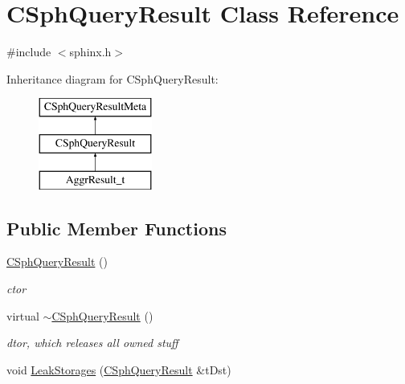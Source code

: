 \hypertarget{classCSphQueryResult}{\section{C\-Sph\-Query\-Result Class Reference}
\label{classCSphQueryResult}
}


{\ttfamily \#include $<$sphinx.\-h$>$}

Inheritance diagram for C\-Sph\-Query\-Result\-:\begin{figure}[H]
\begin{center}
\leavevmode
\includegraphics[height=3.000000cm]{classCSphQueryResult}
\end{center}
\end{figure}
\subsection*{Public Member Functions}
\begin{DoxyCompactItemize}
\item 
\hyperlink{classCSphQueryResult_a6b5edb61ad56eff6f7fa969bd591bea5}{C\-Sph\-Query\-Result} ()
\begin{DoxyCompactList}\small\item\em ctor \end{DoxyCompactList}\item 
virtual \hyperlink{classCSphQueryResult_a7af90347774684ead733a71f43997372}{$\sim$\-C\-Sph\-Query\-Result} ()
\begin{DoxyCompactList}\small\item\em dtor, which releases all owned stuff \end{DoxyCompactList}\item 
void \hyperlink{classCSphQueryResult_a0bb6e502215160da811f11b0921b37bb}{Leak\-Storages} (\hyperlink{classCSphQueryResult}{C\-Sph\-Query\-Result} \&t\-Dst)
\end{DoxyCompactItemize}
